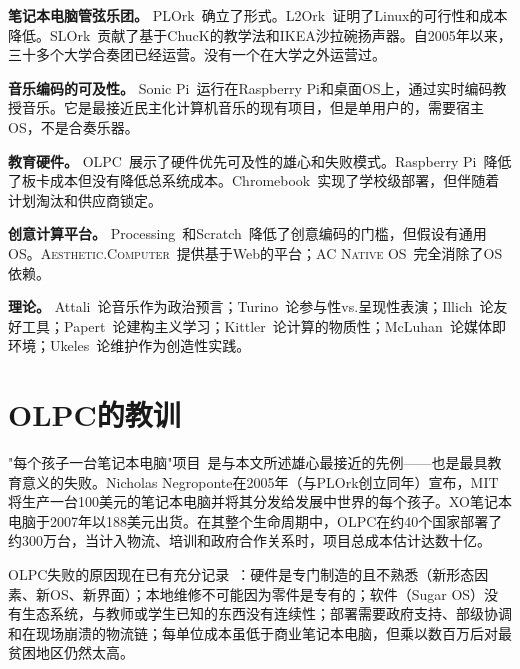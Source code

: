 \documentclass[10pt,letterpaper,twocolumn]{article}
\newcommand{\ac}{\textsc{Aesthetic.Computer}}
\newcommand{\acos}{\textsc{AC Native OS}}
\begin{document}
\textbf{笔记本电脑管弦乐团。} PLOrk~\citep{trueman2006plork}确立了形式。L2Ork~\citep{bukvic2010l2ork}证明了Linux的可行性和成本降低。SLOrk~\citep{wang2009designing}贡献了基于ChucK的教学法和IKEA沙拉碗扬声器。自2005年以来，三十多个大学合奏团已经运营。没有一个在大学之外运营过。

\textbf{音乐编码的可及性。} Sonic Pi~\citep{aaron2016sonic}运行在Raspberry Pi和桌面OS上，通过实时编码教授音乐。它是最接近民主化计算机音乐的现有项目，但是单用户的，需要宿主OS，不是合奏乐器。

\textbf{教育硬件。} OLPC~\citep{negroponte1995being, kraemer2009olpc}展示了硬件优先可及性的雄心和失败模式。Raspberry Pi~\citep{raspberry2012}降低了板卡成本但没有降低总系统成本。Chromebook~\citep{pirg2023chromebook}实现了学校级部署，但伴随着计划淘汰和供应商锁定。

\textbf{创意计算平台。} Processing~\citep{reas2007processing}和Scratch~\citep{resnick2009scratch}降低了创意编码的门槛，但假设有通用OS。\ac{}~\citep{scudder2026ac}提供基于Web的平台；\acos{}~\citep{scudder2026os}完全消除了OS依赖。

\textbf{理论。} Attali~\citep{attali1985noise}论音乐作为政治预言；Turino~\citep{turino2008music}论参与性vs.呈现性表演；Illich~\citep{illich1973tools}论友好工具；Papert~\citep{papert1980mindstorms}论建构主义学习；Kittler~\citep{kittler1995no}论计算的物质性；McLuhan~\citep{mcluhan1964understanding}论媒体即环境；Ukeles~\citep{ukeles1969manifesto}论维护作为创造性实践。


\section{OLPC的教训}
\label{sec:olpc}

"每个孩子一台笔记本电脑"项目~\citep{negroponte1995being, kraemer2009olpc}是与本文所述雄心最接近的先例——也是最具教育意义的失败。Nicholas Negroponte在2005年（与PLOrk创立同年）宣布，MIT将生产一台100美元的笔记本电脑并将其分发给发展中世界的每个孩子。XO笔记本电脑于2007年以188美元出货。在其整个生命周期中，OLPC在约40个国家部署了约300万台，当计入物流、培训和政府合作关系时，项目总成本估计达数十亿。

OLPC失败的原因现在已有充分记录~\citep{kraemer2009olpc}：硬件是专门制造的且不熟悉（新形态因素、新OS、新界面）；本地维修不可能因为零件是专有的；软件（Sugar OS）没有生态系统，与教师或学生已知的东西没有连续性；部署需要政府支持、部级协调和在现场崩溃的物流链；每单位成本虽低于商业笔记本电脑，但乘以数百万后对最贫困地区仍然太高。
\end{document}
